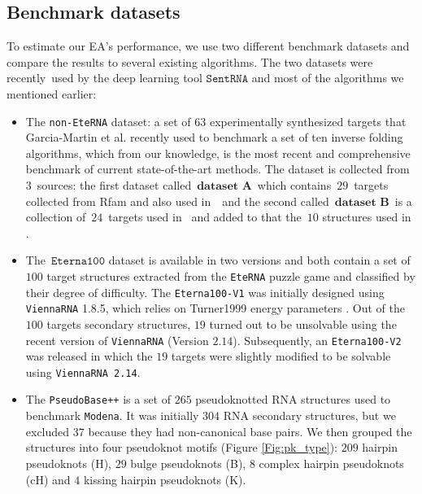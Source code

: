 \subsection{ Benchmark datasets}
To estimate our EA's performance, we use two different benchmark datasets and compare the results to several existing algorithms. The two datasets were recently~used by the deep learning tool
\(\texttt{SentRNA}\) \cite{shi2018sentrna} and most of the algorithms we mentioned earlier:

\begin{itemize}
	\item The \texttt{non-EteRNA} dataset: a set of \(63\) experimentally synthesized targets that
	Garcia-Martin et al. \citep{garcia2013rnaifold} recently used to benchmark a set of ten inverse folding algorithms, which from our knowledge, is the most recent and comprehensive benchmark of current state-of-the-art methods. The dataset is collected from~\(3\)~sources: the first dataset called~\(\textbf{dataset A}\)~which contains~\(29\)~targets collected from Rfam and also used in~\citep{esmaili2015erd,taneda2011modena}~and the second called~\(\textbf{dataset B}\)~is a collection of~\(24\)~targets used in~\cite{esmaili2015erd} and added to that the~\(10\) structures used in \citep{shi2018sentrna}.
	
	\item The~\(\texttt{Eterna100}\) dataset \cite{Eterna} is available in two versions and both contain a set of \(100\) target structures extracted from the \texttt{EteRNA} puzzle game and classified by their degree of difficulty. The \texttt{Eterna100-V1} was initially designed using \texttt{ViennaRNA} 1.8.5, which relies on Turner1999 energy parameters \cite{Turn1999}. Out of the $100$ targets secondary structures, $19$ turned out to be unsolvable using the recent version of \texttt{ViennaRNA} (Version $2.14$). Subsequently, an \texttt{Eterna100-V2} \cite{Eterna} was released in which the $19$ targets were slightly modified to be solvable using \texttt{ViennaRNA 2.14}. 
	
	\item The \texttt{PseudoBase++} is a set of $265$ pseudoknotted RNA structures used to benchmark \texttt{Modena}. It was initially $304$ RNA secondary structures, but we excluded $37$ because they had non-canonical base pairs. We then grouped the structures into four pseudoknot motifs (Figure \ref{Fig:pk_type}): $209$ hairpin pseudoknots (H), $29$ bulge pseudoknots (B), $8$ complex hairpin pseudoknots (cH) and $4$ kissing hairpin pseudoknots (K).  
	

\end{itemize}

